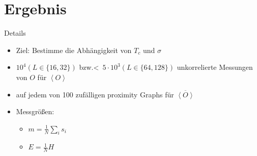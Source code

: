 \documentclass{beamer}
\newcommand{\avg}[1]{\left< #1 \right>}
\begin{document}
\section{Ergebnis}
    \begin{frame}{Details}
        \begin{itemize}[<+->]
            \item Ziel: Bestimme die Abhängigkeit von \(T_{c}\) und \(\sigma\)
            \item \(10^{4} (L\in\{16,32\})\) bzw.<\ \(5\cdot 10^{3} (L\in\{64,128\})\) unkorrelierte Messungen von \(O\) für \(\avg{O}\)
            \item auf jedem von 100 zufälligen proximity Graphs für \(\overline{\avg{O}}\)
            \item Messgrößen:
            \begin{itemize}[<+->]
                \item \(m = \frac{1}{N} \sum_{i} s_{i}\)
                \item \(E = \frac{1}{N} H\)
            \end{itemize}
        \end{itemize}
    \end{frame}
\end{document}
